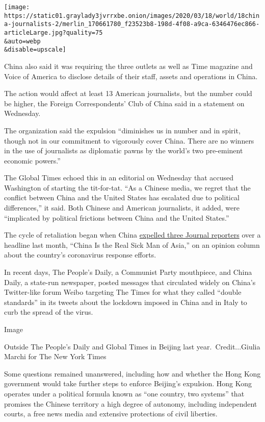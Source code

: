 \texttt{[image: https://static01.graylady3jvrrxbe.onion/images/2020/03/18/world/18china-journalists-2/merlin\_170661780\_f23523b8-198d-4f08-a9ca-6346476ec866-articleLarge.jpg?quality=75\\\&auto=webp\\\&disable=upscale]}

China also said it was requiring the three outlets as well as Time
magazine and Voice of America to disclose details of their staff, assets
and operations in China.

The action would affect at least 13 American journalists, but the number
could be higher, the Foreign Correspondents' Club of China said in a
statement on Wednesday.

The organization said the expulsion ``diminishes us in number and in
spirit, though not in our commitment to vigorously cover China. There
are no winners in the use of journalists as diplomatic pawns by the
world's two pre-eminent economic powers.''

The Global Times echoed this in an editorial on Wednesday that accused
Washington of starting the tit-for-tat. ``As a Chinese media, we regret
that the conflict between China and the United States has escalated due
to political differences,'' it said. Both Chinese and American
journalists, it added, were ``implicated by political frictions between
China and the United States.''

The cycle of retaliation began when China
\href{https://www.nytimes3xbfgragh.onion/2020/02/19/business/media/china-wall-street-journal.html}{expelled
three Journal reporters} over a headline last month, ``China Is the Real
Sick Man of Asia,'' on an opinion column about the country's coronavirus
response efforts.

In recent days, The People's Daily, a Communist Party mouthpiece, and
China Daily, a state-run newspaper, posted messages that circulated
widely on China's Twitter-like forum Weibo targeting The Times for what
they called ``double standards'' in its tweets about the lockdown
imposed in China and in Italy to curb the spread of the virus.

Image

Outside The People's Daily and Global Times in Beijing last
year.~Credit...Giulia Marchi for The New York Times

Some questions remained unanswered, including how and whether the Hong
Kong government would take further steps to enforce Beijing's expulsion.
Hong Kong operates under a political formula known as ``one country, two
systems'' that promises the Chinese territory a high degree of autonomy,
including independent courts, a free news media and extensive
protections of civil liberties.

